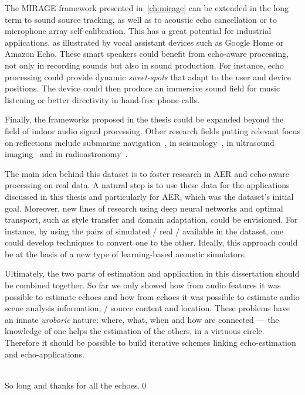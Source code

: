 \mynewline
The \acs{MIRAGE} framework presented in~\cref{ch:mirage} can be extended in the long term to sound source tracking, as well as to acoustic echo cancellation or to microphone array self-calibration.
This has a great potential for industrial applications, as illustrated by vocal assistant devices such as Google Home or Amazon Echo.
These smart speakers could benefit from echo-aware processing, not only in recording sounds but also in sound production.
For instance, echo processing could provide dynamic \textit{sweet-spots} that adapt to the user and device positions.
The device could then produce an immersive sound field for music listening or better directivity in hand-free phone-calls.

\mynewline
Finally, the frameworks proposed in the thesis could be expanded beyond the field of indoor audio signal processing.
Other research fields putting relevant focus on reflections include submarine navigation~, in seismology~, in ultrasound imaging~ and in radioastronomy~.


The main idea behind this dataset is to foster research in \ac{AER} and echo-aware processing on real data.
A natural step is to use these data for the applications discussed in this thesis and particularly for \ac{AER}, which was the dataset's initial goal.
Moreover, new lines of research using deep neural networks and optimal transport, such as style transfer and domain adaptation, could be envisioned.
For instance, by using the pairs of simulated \vs/ real \RIRs/ available in the dataset, one could develop techniques to convert one to the other.
Ideally, this approach could be at the basis of a new type of learning-based acoustic simulators.


Ultimately, the two parts of estimation and application in this dissertation should be combined together.
So far we only showed how from audio features it was possible to estimate echoes and how from echoes it was possible to estimate audio scene analysis information, \eg/ source content and location.
These problems have an innate \textit{uroboric} nature: where, what, when and how are connected --- the knowledge of one helps the estimation of the others, in a virtuous circle.
Therefore it should be possible to build iterative schemes linking echo-estimation and echo-applications.

\mynewline
\\So long and thanks for all the echoes.\qed
